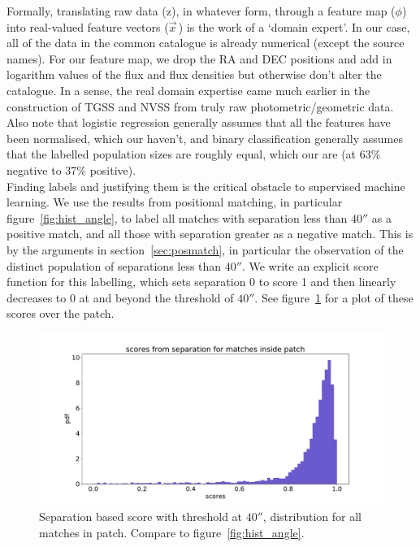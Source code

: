 \documentclass[12pt,a4paper]{article}
\begin{document}
Formally, translating raw data (z), in whatever form, through a feature map ($\phi$) into real-valued feature vectors ($\vec{x}$\,) is the work of a `domain expert'. In our case, all of the data in the common catalogue is already numerical (except the source names). For our feature map, we drop the RA and DEC positions and add in logarithm values of the flux and flux densities but otherwise don't alter the catalogue. In a sense, the real domain expertise came much earlier in the construction of TGSS and NVSS from truly raw photometric/geometric data. Also note that logistic regression generally assumes that all the features have been normalised, which our haven't, and binary classification generally assumes that the labelled population sizes are roughly equal, which our are (at 63\% negative to 37\% positive).\\

Finding labels and justifying them is the critical obstacle to supervised machine learning. We use the results from positional matching, in particular figure~\ref{fig:hist_angle}, to label all matches with separation less than $\ang{;;40}$ as a positive match, and all those with separation greater as a negative match. This is by the arguments in section~\ref{sec:posmatch}, in particular the observation of the distinct population of separations less than $\ang{;;40}$. We write an explicit score function for this labelling, which sets separation 0 to score 1 and then linearly decreases to 0 at and beyond the threshold of $\ang{;;40}$. See figure~\ref{fig:patch_scores_dist} for a plot of these scores over the patch.
\begin{figure}[H]
    \centering
    \includegraphics[width=\textwidth]{pics/patch_scores_dist.pdf}
    \caption{Separation based score with threshold at $\ang{;;40}$, distribution for all matches in patch. Compare to figure~\ref{fig:hist_angle}.}
    \label{fig:patch_scores_dist}
\end{figure}
\end{document}
